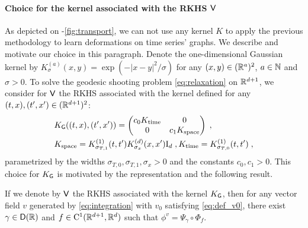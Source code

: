     \paragraph{Choice for the kernel associated with the RKHS $\mathsf{V}$}
    \label{paragraph:kernel_V}
    As depicted on -\ref{fig:transport}, we can not use any kernel $K$ to apply the previous methodology to learn deformations on time series' graphs.
    We describe and motivate our choice in this paragraph.
     Denote the one-dimensional Gaussian kernel by $K_\sigma^{(a)}(x,y)=\exp(-|x-y|^2/\sigma)$ for any $(x,y)\in (\mathbb{R}^a)^2$, $a\in \mathbb{N}$ and $\sigma>0$.
    To solve the geodesic shooting problem \eqref{eq:relaxation} on $\mathbb{R}^{d+1}$, we consider for $\mathsf{V}$ the RKHS associated with the kernel defined for any $(t,x),(t',x')\in (\mathbb{R}^{d+1})^2$:
    \begin{align}
      \label{eq:kernel_TAS}
      &K_{\mathsf{G}}((t,x),(t',x'))=\begin{pmatrix}
        c_0K_{\text{time}} & 0 \\
        0 & c_1 K_{\text{space}} 
        \end{pmatrix} \; ,\\
       & K_{\text{space}}=K_{\sigma_{T,1}}^{(1)}(t,t')K_{\sigma_x}^{(d)}(x,x') \mathrm{I}_d\;,K_{\text{time}}=K_{\sigma_{T,0}}^{(1)}(t,t') \;,
    \end{align}
    parametrized by the widths $\sigma_{T,0},\sigma_{T,1},\sigma_x>0$ and the constants $c_0,c_1>0$.
This choice for $K_{\mathsf{G}}$ is motivated by the representation  and the following result. 
    \begin{lemma}
      \label{lemma:choice_of_kernel_V}
      If we denote by $\mathsf{V}$ the RKHS associated with the kernel $K_{\mathsf{G}}$, then for any vector field $v$ generated by \eqref{eq:integration} with $v_0$ satisfying \eqref{eq:def_v0},
       there exist $\gamma \in \mathsf{D}(\mathbb{R}) $ and $f\in \mathrm{C}^1(\mathbb{R}^{d+1},\mathbb{R}^d)$ such that $\phi^v=\Psi_\gamma\circ\Phi_f $.
    \end{lemma}
